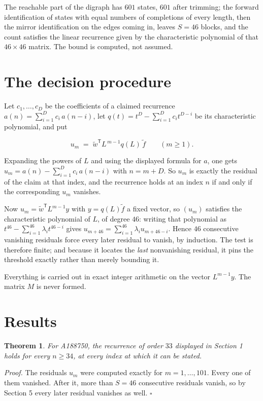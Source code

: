 \documentclass[11pt]{article}
\newtheorem{theorem}{Theorem}
\theoremstyle{definition}
\begin{document}
The reachable part of the digraph has $601$ states, $601$ after trimming; the forward identification of states with equal numbers of completions of every length, then the mirror identification on the edges coming in, leaves $S = 46$ blocks, and the count satisfies the linear recurrence given by the characteristic polynomial of that $46\times46$ matrix. The bound is computed, not assumed.

\section{The decision procedure}

Let $c_1,\dots,c_D$ be the coefficients of a claimed recurrence $a(n) = \sum_{i=1}^{D} c_i\,a(n-i)$, let $q(t) = t^{D} - \sum_{i=1}^{D} c_i t^{D-i}$ be its characteristic polynomial, and put

\[u_m \;=\; \tilde w^{\mathsf T} L^{\,m-1} q(L)\,\tilde f \qquad (m \ge 1).\]

Expanding the powers of $L$ and using the displayed formula for $a$, one gets $u_m = a(n) - \sum_{i=1}^{D} c_i\,a(n-i)$ with $n = m + D$. So $u_m$ is exactly the residual of the claim at that index, and the recurrence holds at an index $n$ if and only if the corresponding $u_m$ vanishes.

Now $u_m = \tilde w^{\mathsf T} L^{m-1} y$ with $y = q(L)\tilde f$ a fixed vector, so $(u_m)$ satisfies the characteristic polynomial of $L$, of degree $46$: writing that polynomial as $t^{46} - \sum_{i=1}^{46} \lambda_i t^{46-i}$ gives $u_{m+46} = \sum_{i=1}^{46} \lambda_i u_{m+46-i}$. Hence $46$ consecutive vanishing residuals force every later residual to vanish, by induction. The test is therefore finite; and because it locates the {\itshape last} nonvanishing residual, it pins the threshold exactly rather than merely bounding it.

Everything is carried out in exact integer arithmetic on the vector $L^{m-1}y$. The matrix $M$ is never formed.

\section{Results}

\begin{theorem} For A188750, the recurrence of order $33$ displayed in Section 1 holds for every $n \ge 34$, at every index at which it can be stated.\end{theorem}

{\itshape Proof.} The residuals $u_m$ were computed exactly for $m = 1,\dots,101$. Every one of them vanished. After it, more than $S = 46$ consecutive residuals vanish, so by Section 5 every later residual vanishes as well. $\square$
\end{document}
